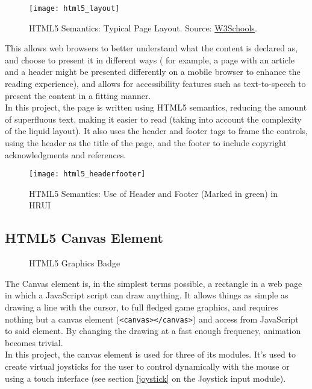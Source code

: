 \begin{figure}[h]
\begin{center}
  \texttt{[image: html5\_layout]}
  \end{center}
  \caption{HTML5 Semantics: Typical Page Layout. Source: \href{http://www.w3schools.com/html/html5_semantic_elements.asp}{
  W3Schools}.}
\end{figure}
This allows web browsers to better understand what the content is declared as, and choose to present it in different ways (
for example, a page with an article and a header might be presented differently on a mobile browser to enhance the reading 
experience), and allows for accessibility features such as text-to-speech to present the content in a fitting manner.\\

In this project, the page is written using HTML5 semantics, reducing the amount of superfluous text, making it easier to
read (taking into account the complexity of the liquid layout). It also uses the header and footer tags to frame the
controls, using the header as the title of the page, and the footer to include copyright acknowledgments and references.
\begin{figure}[h]
\begin{center}
  \texttt{[image: html5\_headerfooter]}
  \end{center}
  \caption{HTML5 Semantics: Use of Header and Footer (Marked in green) in HRUI}
\end{figure}
\subsection{HTML5 Canvas Element}
\begin{figure}[h]
\centering

\caption{HTML5 Graphics Badge}
\end{figure}
The Canvas element is, in the simplest terms possible, a rectangle in a web page in which a JavaScript script can draw
anything. It allows things as simple as drawing a line with the cursor, to full fledged game graphics, and requires
nothing but a canvas element (\texttt{<canvas></canvas>}) and access from JavaScript to said element. By
changing the drawing at a fast enough frequency, animation becomes trivial.\\

In this project, the canvas element is used for three of its modules. It's used to create virtual joysticks for the user
to control dynamically with the mouse or using a touch interface (see section \ref{joystick} on the Joystick input module).\\

